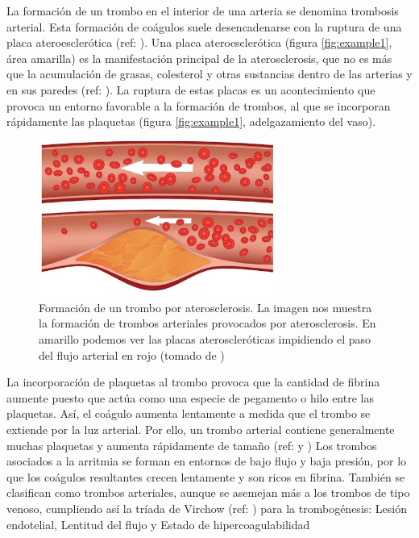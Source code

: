 
La formación de un trombo en el interior de una arteria se denomina trombosis arterial. Esta formación de coágulos suele desencadenarse con la ruptura de una placa ateroesclerótica (ref: \cite{Trombosis_Bayer}). Una placa ateroesclerótica (figura \ref{fig:example1}, área amarilla) es la manifestación principal de la aterosclerosis, que no es más que la acumulación de grasas, colesterol y otras sustancias dentro de las arterias y en sus paredes (ref: \cite{Aterosclerosis_inflamacion}). La ruptura de estas placas es un acontecimiento que provoca un entorno favorable a la formación de trombos, al que se incorporan rápidamente las plaquetas (figura \ref{fig:example1}, adelgazamiento del vaso).

\begin{figure}[h]
    \centering
	\includegraphics[width=0.70\textwidth]{figures/aterosclerosis.jpg}
	\caption{Formación de un trombo por aterosclerosis. La imagen nos muestra la formación de trombos arteriales provocados por aterosclerosis. En amarillo podemos ver las placas ateroscleróticas impidiendo el paso del flujo arterial en rojo (tomado de \cite{imagen_trombo})}
	\label{fig:Figura 1}
  \end{figure}
  
La incorporación de plaquetas al trombo provoca que la cantidad de fibrina aumente puesto que actúa como una especie de pegamento o hilo entre las plaquetas. Así, el coágulo aumenta lentamente a medida que el trombo se extiende por la luz arterial. Por ello, un trombo arterial contiene generalmente muchas plaquetas y aumenta rápidamente de tamaño (ref: \cite{Aterosclerosis_inflamacion} y \cite{Trombosis_Bayer})
Los trombos asociados a la arritmia se forman en entornos de bajo flujo y baja presión, por lo que los coágulos resultantes crecen lentamente y son ricos en fibrina. También se clasifican como trombos arteriales, aunque se asemejan más a los trombos de tipo venoso, cumpliendo así la tríada de Virchow (ref: \cite{Triada_Virchow}) para la trombogénesis: Lesión endotelial, Lentitud del flujo y Estado de hipercoagulabilidad
\\

